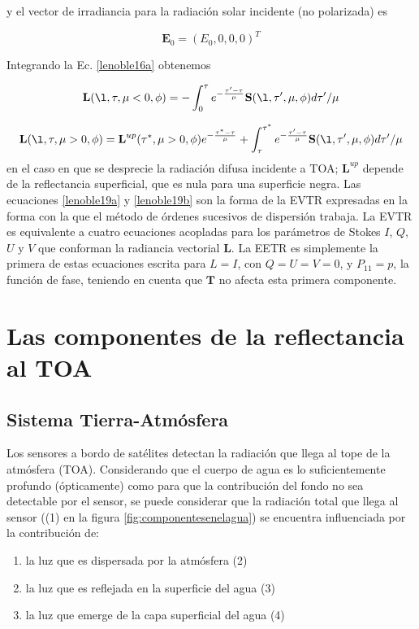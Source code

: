y el vector de irradiancia para la radiación solar incidente (no polarizada) es

\begin{equation}
\textbf{E}_{0}=(E_{0},0,0,0)^{T}
\label{lenoble18}
\end{equation}

Integrando la Ec. \eqref{lenoble16a} obtenemos

\begin{equation}
\textbf{L}(\l,\tau,\mu<0,\phi) = 
-\int_{0}^{\tau}e^{-\frac{\tau'-\tau}{\mu}}\textbf{S}(\l,\tau', 
\mu,\phi)d\tau'/\mu
\label{lenoble19a}
\end{equation}

\begin{equation}
\textbf{L}(\l,\tau,\mu>0,\phi)= 
\textbf{L}^{up}(\tau^{*},\mu>0,\phi)e^{-\frac{\tau^{*}-\tau}{\mu}}+\int_{\tau}^{\tau^
{*}}e^{-\frac{\tau'-\tau}{\mu}}\textbf{S}(\l,\tau', \mu, \phi)d\tau'/\mu
\label{lenoble19b}
\end{equation}
en el caso en que se desprecie la radiación difusa incidente a TOA; $\textbf{L}^{up}$ depende de la reflectancia superficial, que es nula para una superficie negra. Las ecuaciones \eqref{lenoble19a} y \eqref{lenoble19b} son la forma de la
EVTR expresadas en la forma con la que el método de órdenes sucesivos de dispersión trabaja.
La EVTR es equivalente a cuatro ecuaciones acopladas para los parámetros de Stokes $I$, $Q$, $U$ y $V$ que conforman la radiancia vectorial $\textbf{L}$. La EETR es simplemente la primera de estas ecuaciones 
escrita para $L=I$, con $Q=U=V=0$, y $P_{11}=p$, la función de fase,
teniendo en cuenta que $\textbf{T}$ no afecta esta primera componente.

\section{Las componentes de la reflectancia al TOA}
\subsection{Sistema Tierra-Atmósfera}
Los sensores a bordo de satélites detectan la radiación que llega al tope de la
atmósfera (TOA). Considerando que el cuerpo de agua es lo suficientemente profundo (ópticamente) como para
que la contribución del fondo no sea detectable por el sensor, se puede considerar
que la radiación total que llega al sensor ((1) en la figura \ref{fig:componentesenelagua}) se encuentra
influenciada por la contribución de:
\begin{enumerate}
\item la luz que es dispersada por la atmósfera (2)
\item la luz que es reflejada en la superficie del agua (3)
\item la luz que emerge de la capa superficial del agua (4)
\end{enumerate}

